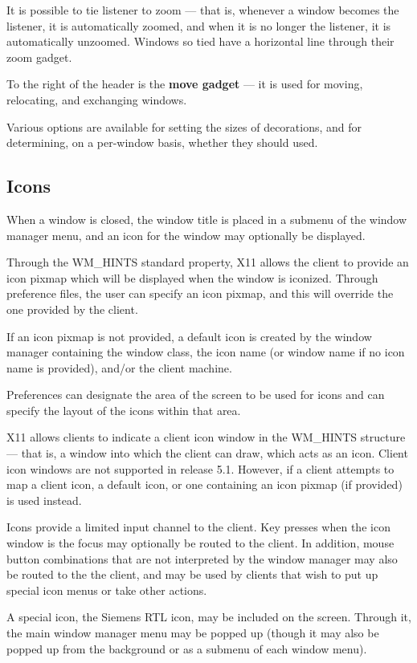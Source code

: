 It is possible to tie listener to zoom --- that is, whenever a window becomes
the listener, it is automatically zoomed, and when it is no longer the
listener, it is automatically unzoomed.  Windows so tied have a
horizontal line through their zoom gadget.

To the right of the header is the {\bf move gadget} --- it is used for
moving, relocating, and exchanging windows.

Various options are available for setting the sizes of decorations, and
for determining, on a per-window basis, whether they should used.

\subsection{Icons}

When a window is closed, the window title is placed in a submenu
of the window manager menu, and an icon for the window may
optionally be displayed.

Through the {\sc WM\_HINTS} standard property, X11 allows the client to
provide an icon pixmap which will be displayed when the window is
iconized.  Through preference files, the user can specify an icon pixmap,
and this will override the one provided by the client.

If an icon pixmap is not provided, a default icon
is created by the window manager containing the window class,
the icon name (or window name if no icon name is provided), and/or
the client machine.

Preferences can designate the area of the screen to be used
for icons and can specify the layout of the icons within that area.

X11 allows clients to indicate a client icon window in the {\sc WM\_HINTS}
structure --- that is, a window into which the client can draw, which acts
as an icon.  Client icon windows are not supported in release 5.1.
However, if a client attempts to map a client icon, a default icon, or
one containing an icon pixmap (if provided) is used instead.

Icons provide a limited input channel to the client.  Key presses when
the icon window is the focus may optionally be routed to the client.  In
addition, mouse button combinations that are not interpreted by the
window manager may also be routed to the the client, and may be used by
clients that wish to put up special icon menus or take other actions.

A special icon, the Siemens RTL icon, may be included on the screen.
Through it, the main window manager menu may be popped up (though it may
also be popped up from the background or as a submenu of each window
menu).

